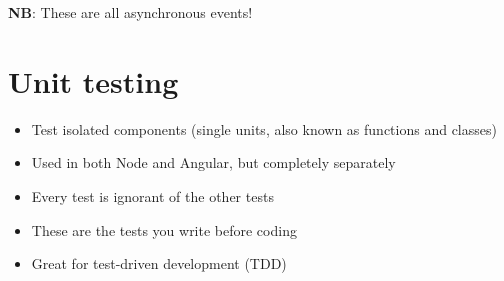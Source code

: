 \documentclass[british]{article}
\begin{document}
\textbf{NB}: These are all asynchronous events!



\section{Unit testing}

\begin{itemize}
  \item Test isolated components (single units, also known as functions and classes)
  \item Used in both Node and Angular, but completely separately
  \item Every test is ignorant of the other tests
  \item These are the tests you write before coding
  \item Great for test-driven development (TDD)
\end{itemize}
\end{document}
